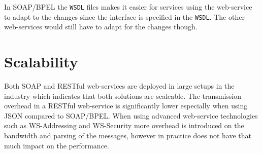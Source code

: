 In SOAP/BPEL the \texttt{WSDL} files makes it easier for services using the web-service to adapt to the changes since the interface is specified in the \texttt{WSDL}. The other web-services would still have to adapt for the changes though.

\section{Scalability}
Both SOAP and RESTful web-services are deployed in large setups in the industry which indicates that both solutions are scaleable. The transmission overhead in a RESTful web-service is significantly lower especially when using JSON compared to SOAP/BPEL. When using advanced web-service technologies such as WS-Addressing and WS-Security more overhead is introduced on the bandwidth and parsing of the messages, however in practice does not have that much impact on the performance.

